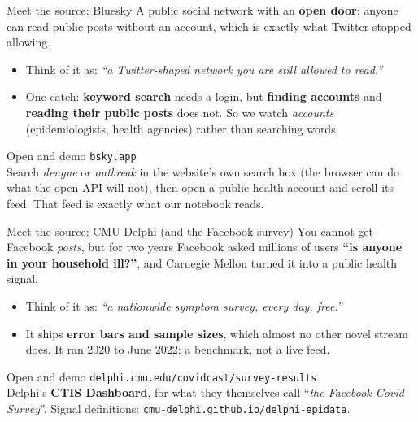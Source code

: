 \documentclass[aspectratio=169,11pt]{beamer}
\begin{document}
\begin{frame}{Meet the source: Bluesky}
  A public social network with an \textbf{open door}: anyone can read public posts without an
  account, which is exactly what Twitter stopped allowing.
  \begin{itemize}
    \item Think of it as: \emph{``a Twitter-shaped network you are still allowed to read.''}
    \item One catch: \textbf{keyword search} needs a login, but \textbf{finding accounts} and
          \textbf{reading their public posts} does not. So we watch \emph{accounts}
          (epidemiologists, health agencies) rather than searching words.
  \end{itemize}
  \begin{exampleblock}{Open and demo}
    \texttt{bsky.app} \\
    Search \emph{dengue} or \emph{outbreak} in the website's own search box (the browser can
    do what the open API will not), then open a public-health account and scroll its feed.
    That feed is exactly what our notebook reads.
  \end{exampleblock}
\end{frame}

\begin{frame}{Meet the source: CMU Delphi (and the Facebook survey)}
  You cannot get Facebook \emph{posts}, but for two years Facebook asked millions of users
  \textbf{``is anyone in your household ill?''}, and Carnegie Mellon turned it into a public
  health signal.
  \begin{itemize}
    \item Think of it as: \emph{``a nationwide symptom survey, every day, free.''}
    \item It ships \textbf{error bars and sample sizes}, which almost no other novel stream
          does. It ran 2020 to June 2022: a benchmark, not a live feed.
  \end{itemize}
  \begin{exampleblock}{Open and demo}
    \texttt{delphi.cmu.edu/covidcast/survey-results} \\
    Delphi's \textbf{CTIS Dashboard}, for what they themselves call
    ``\emph{the Facebook Covid Survey}''. Signal definitions:
    \texttt{cmu-delphi.github.io/delphi-epidata}.
  \end{exampleblock}
\end{frame}

\end{document}
